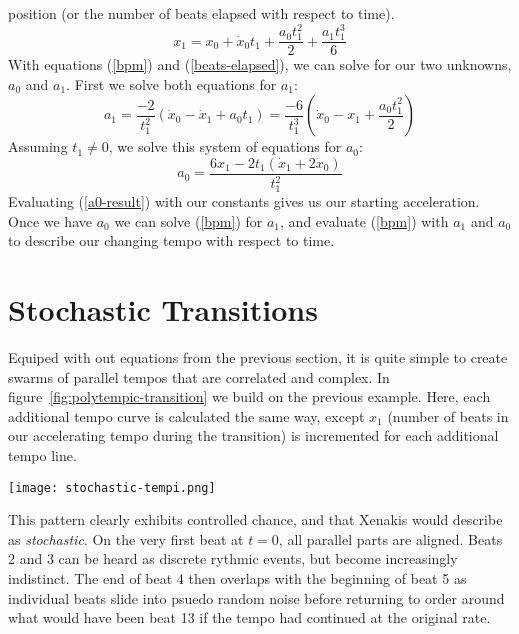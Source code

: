 position (or the number of beats elapsed with respect to time).
\begin{equation}
	\label{beats-elapsed}
	x_1 = x_0 + \dot{x}_0t_1 + \frac{a_0t_1^2}{2} + \frac{a_1t_1^3}{6}
\end{equation}
With equations (\ref{bpm}) and (\ref{beats-elapsed}), we can solve for our 
two unknowns, $a_0$ and $a_1$. First we solve both equations for $a_1$:
\begin{displaymath}
    \label{a1-solution}
    a_1=
    \frac{-2}{t_1^2}(\dot{x}_0-\dot{x}_1 + a_0t_1)=
    \frac{-6}{t_1^3}(\dot{x}_0-x_1 + \frac{a_0t_1^2}{2})
\end{displaymath}
Assuming $t_1 \neq 0$, we solve this system of equations for $a_0$:
\begin{equation}
	\label{a0-result}
	a_0=\frac{6x_1-2t_1(\dot{x}_1+2\dot{x}_0)}{t_1^2}
\end{equation}
Evaluating (\ref{a0-result}) with our constants gives us our starting
acceleration. Once we have $a_0$ we can solve (\ref{bpm}) for $a_1$, and 
evaluate (\ref{bpm}) with $a_1$ and $a_0$ to describe our changing tempo 
with respect to time.

\section{Stochastic Transitions}
\label{sec:polytempic-implementation}
Equiped with out equations from the previous section, it is quite
simple to create swarms of parallel tempos that are correlated and
complex. In figure~\ref{fig:polytempic-transition} we build on the
previous example. Here, each additional tempo curve is calculated the
same way, except $x_1$ (number of beats in our accelerating tempo
during the transition) is incremented for each additional tempo line. 
\begin{figure*}[h!]
  \texttt{[image: stochastic-tempi.png]}
  \caption{Stochastic Tempo Transition from 90~BPM to 120~BPM. Black
    dots are beats in our changing tempi. Grey dots are static
    beats at the original tempo. $12 \geq x_1 \leq 20$}
  \label{fig:polytempic-transition}
\end{figure*}\hfill\break
This pattern clearly exhibits controlled chance, and that Xenakis
would describe as \emph{stochastic}. On the very first beat at $t=0$,
all parallel parts are aligned. Beats 2 and 3 can be heard as discrete
rythmic events, but become increasingly indistinct. The end of beat 4
then overlaps with the beginning of beat 5 as individual beats slide
into psuedo random noise before returning to order around what would
have been beat 13 if the tempo had continued at the original rate. 

